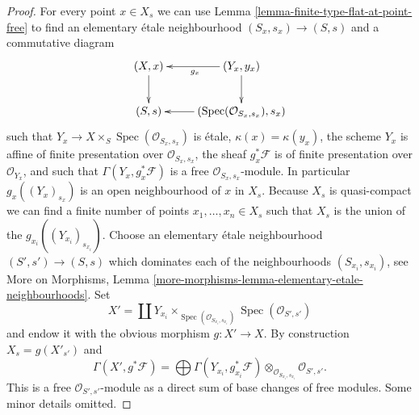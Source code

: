 \documentclass[10pt,a4paper]{amsart}
\theoremstyle{plain}
\theoremstyle{definition}
\theoremstyle{remark}
\numberwithin{equation}{subsection}
\def\Spec{\mathop{\mathrm{Spec}}}
\begin{document}
\begin{proof}
For every point $x \in X_s$ we can use
Lemma \ref{lemma-finite-type-flat-at-point-free}
to find an elementary \'etale neighbourhood $(S_x , s_x) \to (S, s)$
and a commutative diagram
$$
\xymatrix{
(X, x) \ar[d] & (Y_x, y_x) \ar[l]^{g_x} \ar[d] \\
(S, s) & (\Spec(\mathcal{O}_{S_x, s_x}), s_x) \ar[l]
}
$$
such that $Y_x \to X \times_S \Spec(\mathcal{O}_{S_x, s_x})$
is \'etale, $\kappa(x) = \kappa(y_x)$, the scheme $Y_x$ is affine
of finite presentation over $\mathcal{O}_{S_x, s_x}$, the sheaf
$g_x^*\mathcal{F}$ is of finite presentation over $\mathcal{O}_{Y_x}$, and
such that $\Gamma(Y_x, g_x^*\mathcal{F})$ is a free
$\mathcal{O}_{S_x, s_x}$-module. In particular
$g_x((Y_x)_{s_x})$ is an open neighbourhood of $x$ in $X_s$.
Because $X_s$ is quasi-compact we can find a finite number of points
$x_1, \ldots, x_n \in X_s$ such that $X_s$ is the union of
the $g_{x_i}((Y_{x_i})_{s_{x_i}})$. Choose an elementary \'etale neighbourhood
$(S' , s') \to (S, s)$ which dominates each of the neighbourhoods
$(S_{x_i}, s_{x_i})$, see
More on Morphisms,
Lemma \ref{more-morphisms-lemma-elementary-etale-neighbourhoods}.
Set
$$
X' = \coprod Y_{x_i} \times_{\Spec(\mathcal{O}_{S_{x_i}, s_{x_i}})}
\Spec(\mathcal{O}_{S', s'})
$$
and endow it with the obvious morphism $g : X' \to X$.
By construction $X_s = g(X'_{s'})$ and
$$
\Gamma(X', g^*\mathcal{F})
=
\bigoplus \Gamma(Y_{x_i}, g_{x_i}^*\mathcal{F})
\otimes_{\mathcal{O}_{S_{x_i}, s_{x_i}}}
\mathcal{O}_{S', s'}.
$$
This is a free $\mathcal{O}_{S', s'}$-module as a direct sum
of base changes of free modules. Some minor details omitted.
\end{proof}
\end{document}
